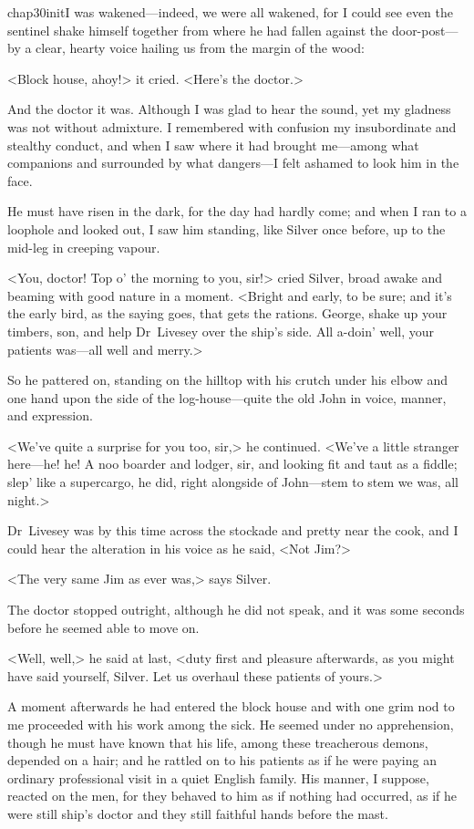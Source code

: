 
\lettrine{chap30initI}{} was wakened—indeed, we were all wakened, for I could see even the sentinel shake himself together from where he had fallen against the door-post—by a clear, hearty voice hailing us from the margin of the wood:

\zz
<Block house, ahoy!> it cried. <Here's the doctor.>

And the doctor it was. Although I was glad to hear the sound, yet my gladness was not without admixture. I remembered with confusion my insubordinate and stealthy conduct, and when I saw where it had brought me—among what companions and surrounded by what dangers—I felt ashamed to look him in the face.

He must have risen in the dark, for the day had hardly come; and when I ran to a loophole and looked out, I saw him standing, like Silver once before, up to the mid-leg in creeping vapour.

<You, doctor! Top o' the morning to you, sir!> cried Silver, broad awake and beaming with good nature in a moment. <Bright and early, to be sure; and it's the early bird, as the saying goes, that gets the rations. George, shake up your timbers, son, and help Dr~Livesey over the ship's side. All a-doin' well, your patients was—all well and merry.>

So he pattered on, standing on the hilltop with his crutch under his elbow and one hand upon the side of the log-house—quite the old John in voice, manner, and expression.

<We've quite a surprise for you too, sir,> he continued. <We've a little stranger here—he! he! A noo boarder and lodger, sir, and looking fit and taut as a fiddle; slep' like a supercargo, he did, right alongside of John—stem to stem we was, all night.>

Dr~Livesey was by this time across the stockade and pretty near the cook, and I could hear the alteration in his voice as he said, <Not Jim?>

<The very same Jim as ever was,> says Silver.

The doctor stopped outright, although he did not speak, and it was some seconds before he seemed able to move on.

<Well, well,> he said at last, <duty first and pleasure afterwards, as you might have said yourself, Silver. Let us overhaul these patients of yours.>

A moment afterwards he had entered the block house and with one grim nod to me proceeded with his work among the sick. He seemed under no apprehension, though he must have known that his life, among these treacherous demons, depended on a hair; and he rattled on to his patients as if he were paying an ordinary professional visit in a quiet English family. His manner, I suppose, reacted on the men, for they behaved to him as if nothing had occurred, as if he were still ship's doctor and they still faithful hands before the mast.


